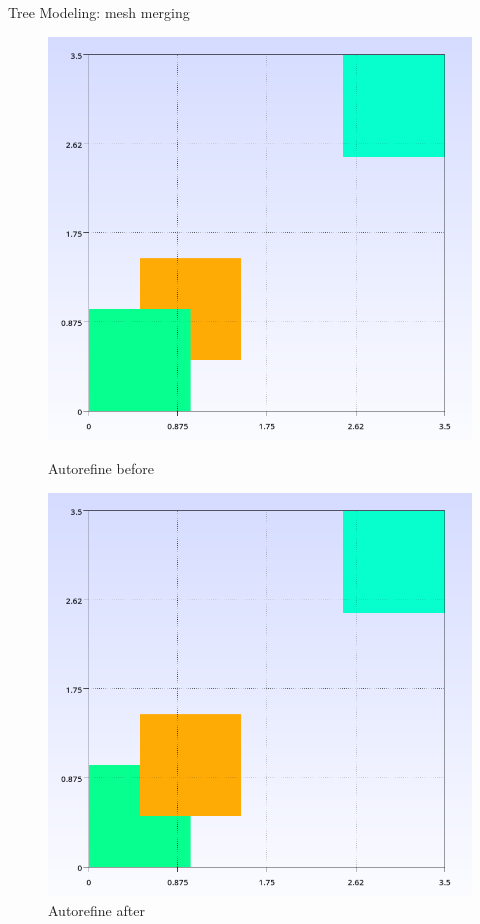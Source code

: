 \documentclass[10pt]{beamer}
\begin{document}
\begin{frame}{Tree Modeling: mesh merging}
	\begin{figure}[h]
		\begin{minipage}{0.49\textwidth}
			\centering
			\includegraphics[width=\textwidth]{images/autorefine_before.png}
			\caption{Autorefine before}
			\label{fig:figure1}
		\end{minipage}\hfill
		\begin{minipage}{0.49\textwidth}
			\centering
			\includegraphics[width=\textwidth]{images/autorefine_after.png}
			\caption{Autorefine after}
			\label{fig:figure2}
		\end{minipage}
	\end{figure}
\end{frame}
\end{document}
